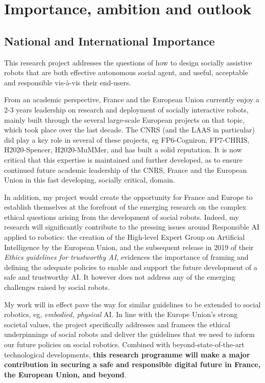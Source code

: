 
\vspace{3em}
\section{Importance, ambition and outlook}


\subsection{National and International Importance}

This research project addresses the questions of how to design socially
assistive robots that are both effective autonomous social agent, and useful,
acceptable and responsible vis-à-vis their end-users.

From an academic perspective, France and the European Union currently enjoy a
2-3 years leadership on research and deployment of socially interactive robots,
mainly built through the several large-scale European projects on that topic,
which took place over the last decade. The CNRS (and the LAAS in particular) did
play a key role in several of these projects, eg FP6-Cogniron, FP7-CHRIS,
H2020-Spencer, H2020-MuMMer, and has built a solid reputation. It is now
critical that this expertise is maintained and further developed, as to ensure
continued future academic leadership of the CNRS, France and the European Union
in this fast developing, socially critical, domain.

In addition, my project would create the opportunity for France and Europe to
establish themselves at the forefront of the emerging research on the complex
ethical questions arising from the development of social robots. Indeed, my
research will significantly contribute to the pressing issues around Responsible
AI applied to robotics: the creation of the High-level Expert Group on
Artificial Intelligence by the European Union, and the subsequent release in
2019 of their \emph{Ethics guidelines for trustworthy AI}, evidences the
importance of framing and defining the adequate policies to enable and support
the future development of a safe and trustworthy AI. It however does not address
any of the emerging challenges raised by social robots.

My work will in effect pave the way for similar guidelines to be extended to
social robotics, eg, \emph{embodied, physical} AI. In line with the Europe
Union's strong societal values, the project specifically addresses and framees
the ethical underpinnings of social robots and deliver the guidelines that we
need to inform our future policies on social robotics. Combined with
beyond-state-of-the-art technological developments, \textbf{this research
programme will make a major contribution in securing a safe and responsible
digital future in France, the European Union, and beyond}. 


